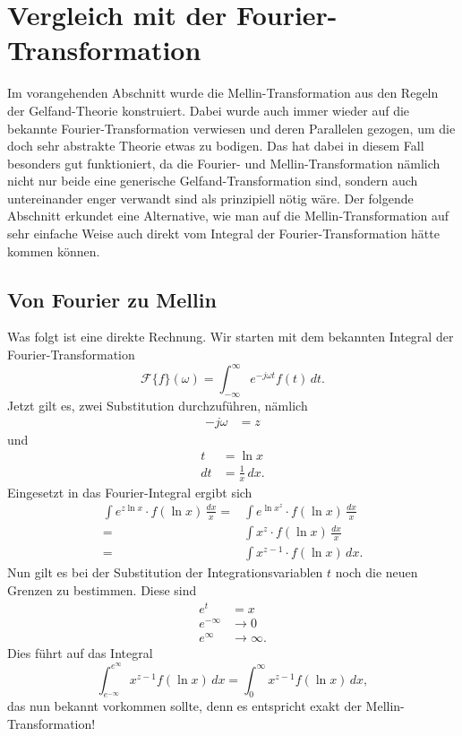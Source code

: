 %
%
%
%
\section{Vergleich mit der Fourier-Transformation
\label{mellin:section:teil3}}
Im vorangehenden Abschnitt wurde die Mellin-Transformation aus den 
Regeln der Gelfand-Theorie konstruiert. 
Dabei wurde auch immer wieder auf die bekannte Fourier-Transformation 
verwiesen und deren Parallelen gezogen, um die doch sehr abstrakte 
Theorie etwas zu bodigen.
Das hat dabei in diesem Fall besonders gut funktioniert, da die 
Fourier- und Mellin-Transformation nämlich nicht nur beide eine 
generische Gelfand-Transformation sind, sondern auch untereinander 
enger verwandt sind als prinzipiell nötig wäre.
Der folgende Abschnitt erkundet eine Alternative, wie man auf die 
Mellin-Transformation auf sehr einfache Weise auch direkt vom 
Integral der Fourier-Transformation hätte kommen können.

\subsection{Von Fourier zu Mellin
\label{mellin:subsection:foumel}}
Was folgt ist eine direkte Rechnung.
Wir starten mit dem bekannten Integral der Fourier-Trans\-for\-ma\-tion
\begin{equation}
    \mathcal{F}\{f \}(\omega) 
    = \int_{-\infty}^{\infty} e^{-j\omega{}t} f(t) \,{d}t
    .
    \label{mellin:fourier}
\end{equation}
Jetzt gilt es, zwei Substitution durchzuführen, nämlich
\begin{align*}
    -j\omega &= z
\end{align*}
und
\begin{align*}
    t &= \ln x \\
    {d}t &= \frac{1}{x}\,{d}x
    .
\end{align*}
Eingesetzt in das Fourier-Integral ergibt sich
\begin{align*}
    \int e^{z \ln x} \cdot f(\ln x) \,\frac{{d}x}{x}
    = &\int e^{\ln x^z} \cdot f(\ln x) \,\frac{{d}x}{x} \\
    = &\int x^{z} \cdot f(\ln x) \,\frac{{d}x}{x} \\
    = &\int x^{z-1} \cdot f(\ln x) \,{d}x
    .
\end{align*}
Nun gilt es bei der Substitution der Integrationsvariablen $t$ 
noch die neuen Grenzen zu bestimmen.
Diese sind
\begin{align*}
    e^{t} &= x \\
    e^{-\infty} &\rightarrow 0 \\
    e^{\infty} &\rightarrow \infty.
\end{align*}
Dies führt auf das Integral
\[
    \int_{e^{-\infty}}^{e^{\infty}} x^{z-1} f(\ln x) \,{d}x 
    = \int_{0}^{\infty} x^{z-1} f(\ln x) \,{d}x
    ,
\]
das nun bekannt vorkommen sollte, denn es entspricht exakt der 
Mellin-Transformation!
\medskip


